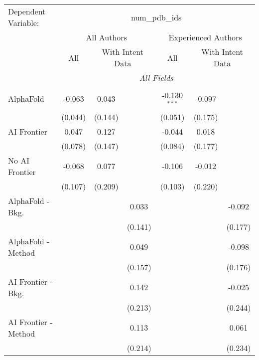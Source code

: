 \begingroup
\centering
\begin{tabular}{lcccccc}
   \tabularnewline \midrule \midrule
   Dependent Variable: & \multicolumn{6}{c}{num\_pdb\_ids}\\
 & \multicolumn{3}{c}{All Authors} & \multicolumn{3}{c}{Experienced Authors} \\
\cmidrule(lr){2-4} \cmidrule(lr){5-7}
 & \multicolumn{1}{c}{All} & \multicolumn{2}{c}{With Intent Data} & \multicolumn{1}{c}{All} & \multicolumn{2}{c}{With Intent Data} \\
\cmidrule(lr){2-2} \cmidrule(lr){3-4} \cmidrule(lr){5-5} \cmidrule(lr){6-7}
 & \multicolumn{6}{c}{\textit{All Fields}} \\ \\
   AlphaFold               & -0.063  & 0.043   &         & -0.130$^{***}$ & -0.097  &   \\   
                           & (0.044) & (0.144) &         & (0.051)        & (0.175) &   \\   
   AI Frontier             & 0.047   & 0.127   &         & -0.044         & 0.018   &   \\   
                           & (0.078) & (0.147) &         & (0.084)        & (0.177) &   \\   
   No AI Frontier          & -0.068  & 0.077   &         & -0.106         & -0.012  &   \\   
                           & (0.107) & (0.209) &         & (0.103)        & (0.220) &   \\   
   AlphaFold - Bkg.        &         &         & 0.033   &                &         & -0.092\\   
                           &         &         & (0.141) &                &         & (0.177)\\   
   AlphaFold - Method      &         &         & 0.049   &                &         & -0.098\\   
                           &         &         & (0.157) &                &         & (0.176)\\   
   AI Frontier - Bkg.      &         &         & 0.142   &                &         & -0.025\\   
                           &         &         & (0.213) &                &         & (0.244)\\   
   AI Frontier - Method    &         &         & 0.113   &                &         & 0.061\\   
                           &         &         & (0.214) &                &         & (0.234)\\   

\end{tabular}
